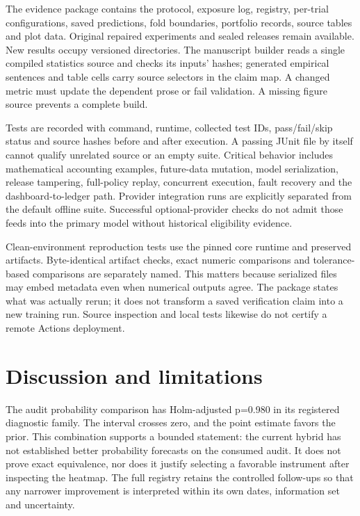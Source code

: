\documentclass[11pt,a4paper]{article}
\begin{document}
The evidence package contains the protocol, exposure log, registry, per-trial configurations, saved predictions, fold boundaries, portfolio records, source tables and plot data. Original repaired experiments and sealed releases remain available. New results occupy versioned directories. The manuscript builder reads a single compiled statistics source and checks its inputs' hashes; generated empirical sentences and table cells carry source selectors in the claim map. A changed metric must update the dependent prose or fail validation. A missing figure source prevents a complete build.

Tests are recorded with command, runtime, collected test IDs, pass/fail/skip status and source hashes before and after execution. A passing JUnit file by itself cannot qualify unrelated source or an empty suite. Critical behavior includes mathematical accounting examples, future-data mutation, model serialization, release tampering, full-policy replay, concurrent execution, fault recovery and the dashboard-to-ledger path. Provider integration runs are explicitly separated from the default offline suite. Successful optional-provider checks do not admit those feeds into the primary model without historical eligibility evidence.

Clean-environment reproduction tests use the pinned core runtime and preserved artifacts. Byte-identical artifact checks, exact numeric comparisons and tolerance-based comparisons are separately named. This matters because serialized files may embed metadata even when numerical outputs agree. The package states what was actually rerun; it does not transform a saved verification claim into a new training run. Source inspection and local tests likewise do not certify a remote Actions deployment.


\section{Discussion and limitations}\label{sec:section-11}

The audit probability comparison has Holm-adjusted p=0.980 in its registered diagnostic family. The interval crosses zero, and the point estimate favors the prior. This combination supports a bounded statement: the current hybrid has not established better probability forecasts on the consumed audit. It does not prove exact equivalence, nor does it justify selecting a favorable instrument after inspecting the heatmap. The full registry retains the controlled follow-ups so that any narrower improvement is interpreted within its own dates, information set and uncertainty.
\end{document}
